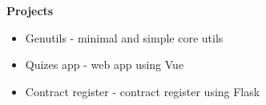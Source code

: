 {\vspace{0.5cm} \hspace{-0.5cm} \Large \textbf{Projects}}

\begin{itemize}
    \item{Genutils - minimal and simple core utils}
    \item{Quizes app - web app using Vue}
    \item{Contract register - contract register using Flask}
\end{itemize}